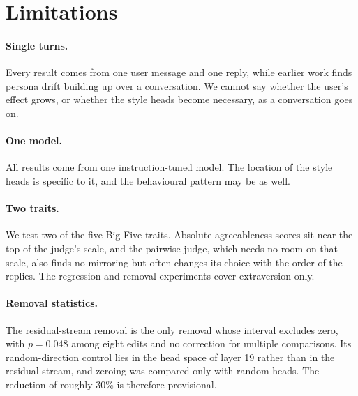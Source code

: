 \section{Limitations}
\label{sec:limitations}

\paragraph{Single turns.}
Every result comes from one user message and one reply, while earlier work finds persona drift building up over a conversation. We cannot say whether the user's effect grows, or whether the style heads become necessary, as a conversation goes on.

\paragraph{One model.}
All results come from one instruction-tuned model. The location of the style heads is specific to it, and the behavioural pattern may be as well.

\paragraph{Two traits.}
We test two of the five Big Five traits. Absolute agreeableness scores sit near the top of the judge's scale, and the pairwise judge, which needs no room on that scale, also finds no mirroring but often changes its choice with the order of the replies. The regression and removal experiments cover extraversion only.

\paragraph{Removal statistics.}
The residual-stream removal is the only removal whose interval excludes zero, with $p = 0.048$ among eight edits and no correction for multiple comparisons. Its random-direction control lies in the head space of layer 19 rather than in the residual stream, and zeroing was compared only with random heads. The reduction of roughly 30\% is therefore provisional.

